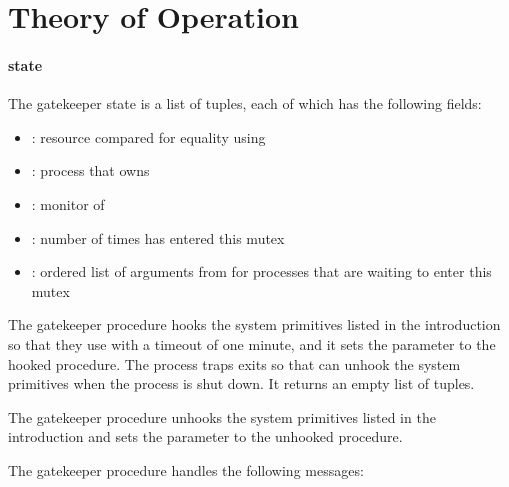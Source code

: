\section {Theory of Operation}

\paragraph* {state} The gatekeeper state is a
list of 
tuples, each of which has the following fields:\antipar

\begin{itemize}
\item {}: resource compared for equality using 
\item {}: process that owns 
\item {}: monitor of 
\item {}: number of times  has entered this
  mutex
\item {}: ordered list of  arguments from
   for processes that are waiting to enter this
  mutex
\end{itemize}

 The gatekeeper  procedure
hooks the system primitives listed in the introduction so that they
use  with a timeout of one minute, and it
sets the  parameter to the hooked
 procedure. The process traps exits so that
 can unhook the system primitives when the process is
shut down. It returns an empty list of  tuples.

 The gatekeeper 
procedure unhooks the system primitives listed in the introduction and
sets the  parameter to the unhooked
 procedure.

 The gatekeeper
 procedure handles the following messages:\antipar

